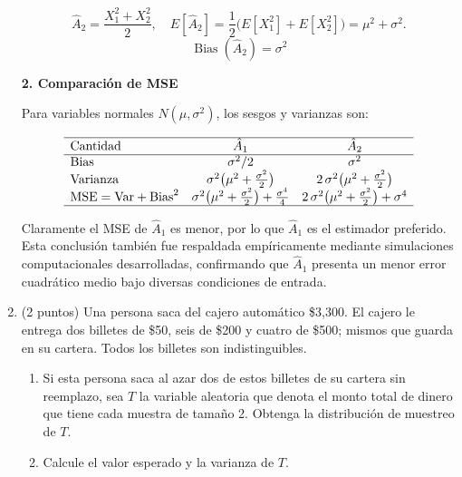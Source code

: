 \documentclass[12pt]{article}
\begin{document}
\begin{enumerate}
	      \[
		      \hat A_{2}= \frac{X_{1}^{2}+X_{2}^{2}}{2},\quad
		      E[\hat A_{2}]
		      =\frac{1}{2}\bigl(E[X_{1}^{2}]+E[X_{2}^{2}]\bigr)
		      =\mu^{2}+\sigma^{2}.
	      \]
	      \[
		      \boxed{\operatorname{Bias}(\hat A_{2})=\sigma^{2}}
	      \]

	      \medskip
	      \textbf{2. Comparación de MSE}

	      Para variables normales \(N(\mu,\sigma^{2})\), los sesgos y varianzas son:

	      \[
		      \begin{array}{lcc}
			      \hline
			      \text{Cantidad} & \hat A_{1}                                                                & \hat A_{2} \\
			      \hline
			      \text{Bias}     & \sigma^{2}/2                                                              & \sigma^{2} \\
			      \text{Varianza} & \sigma^{2}\bigl(\mu^{2}+\tfrac{\sigma^{2}}{2}\bigr)
			                      & 2\,\sigma^{2}\bigl(\mu^{2}+\tfrac{\sigma^{2}}{2}\bigr)                                 \\
			      \text{MSE} = \mathrm{Var} + \mathrm{Bias}^{2}
			                      & \sigma^{2}\bigl(\mu^{2}+\tfrac{\sigma^{2}}{2}\bigr)+\tfrac{\sigma^{4}}{4}
			                      & 2\,\sigma^{2}\bigl(\mu^{2}+\tfrac{\sigma^{2}}{2}\bigr)+\sigma^{4}                      \\
			      \hline
		      \end{array}
	      \]

	      Claramente el MSE de \(\hat A_{1}\) es menor, por lo que \(\hat A_{1}\) es el estimador preferido.\\
	      Esta conclusión también fue respaldada empíricamente mediante simulaciones computacionales desarrolladas, confirmando que \(\hat A_1\) presenta un menor error cuadrático medio bajo diversas condiciones de entrada.
	      \endgroup

	\item (2 puntos) Una persona saca del cajero automático \$3,300. El cajero le entrega dos billetes de \$50, seis de \$200 y cuatro de \$500; mismos que guarda en su cartera. Todos los billetes son indistinguibles.

	      \begin{enumerate}
		      \item Si esta persona saca al azar dos de estos billetes de su cartera sin reemplazo,
		            sea $T$ la variable aleatoria que denota el monto total de dinero que tiene
		            cada muestra de tamaño 2. Obtenga la distribución de muestreo de $T$.
		      \item Calcule el valor esperado y la varianza de $T$.
	      \end{enumerate}


\end{enumerate}
\end{document}
